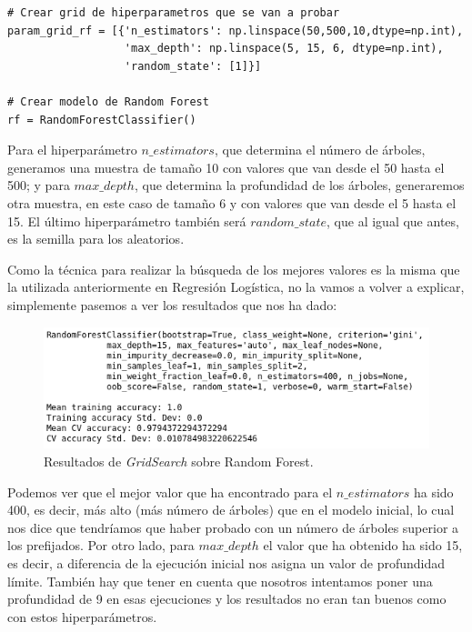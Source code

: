 \documentclass[11pt,a4paper]{article}
\begin{document}
\begin{lstlisting}
# Crear grid de hiperparametros que se van a probar
param_grid_rf = [{'n_estimators': np.linspace(50,500,10,dtype=np.int),
                  'max_depth': np.linspace(5, 15, 6, dtype=np.int),
                  'random_state': [1]}]

# Crear modelo de Random Forest
rf = RandomForestClassifier()

\end{lstlisting}

Para el hiperparámetro $n\_estimators$, que determina el número de árboles, generamos una muestra de tamaño 10 con valores que van desde el
50 hasta el 500; y para $max\_depth$, que determina la profundidad de los árboles, generaremos otra muestra, en este caso de tamaño 6 y con
valores que van desde el 5 hasta el 15. El último hiperparámetro también será $random\_state$, que al igual que antes, es la semilla para
los aleatorios.

Como la técnica para realizar la búsqueda de los mejores valores es la misma que la utilizada anteriormente en Regresión Logística, no la
vamos a volver a explicar, simplemente pasemos a ver los resultados que nos ha dado:

\begin{figure}[H]
    \centering
    \includegraphics[scale=0.6]{img/gs-rf.png}
    \caption{Resultados de \textit{GridSearch} sobre Random Forest.}
    \label{fig:gs-rf}
\end{figure}

Podemos ver que el mejor valor que ha encontrado para el $n\_estimators$ ha sido 400, es decir, más alto (más número de árboles) que en el
modelo inicial, lo cual nos dice que tendríamos que haber probado con un número de árboles superior a  los prefijados. Por otro lado, para
$max\_depth$ el valor que ha obtenido ha sido 15, es decir, a diferencia de la ejecución inicial nos asigna un valor de profundidad límite.
También hay que tener en cuenta que nosotros intentamos poner una profundidad de 9 en esas ejecuciones y los resultados no eran tan buenos
como con estos hiperparámetros.
\end{document}
